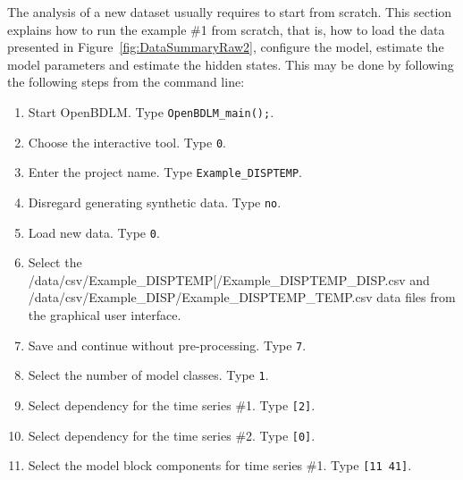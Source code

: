 The analysis of a new dataset usually requires to start from scratch.
This section explains how to run the example \#1 from scratch, that is, how to load the data presented in Figure~\ref{fig:DataSummaryRaw2}, configure the model, estimate the model parameters and estimate the hidden states.
This may be done by following the following steps from the \MATLAB{} command line:
\begin{enumerate}
\item Start OpenBDLM. Type \colorbox{light-gray}{\lstinline[basicstyle = \mlttfamily \small, backgroundcolor = \color{light-gray}]!OpenBDLM_main();!}.
\item Choose the interactive tool. Type \colorbox{light-gray}{\lstinline[basicstyle = \mlttfamily \small, backgroundcolor = \color{light-gray}]!0!}.
\item Enter the project name. Type \colorbox{light-gray}{\lstinline[basicstyle = \mlttfamily \small, backgroundcolor = \color{light-gray}]!Example_DISPTEMP!}. 
\item Disregard generating synthetic data. Type \colorbox{light-gray}{\lstinline[basicstyle = \mlttfamily \small, backgroundcolor = \color{light-gray}]!no!}. 
\item Load new data. Type \colorbox{light-gray}{\lstinline[basicstyle = \mlttfamily \small, backgroundcolor = \color{light-gray}]!0!}.
\item Select the /data/csv/Example\_DISPTEMP[/Example\_DISPTEMP\_DISP.csv and /data/csv/Example\_DISP/Example\_DISPTEMP\_TEMP.csv data files from the graphical user interface. 
\item Save and continue without pre-processing. Type \colorbox{light-gray}{\lstinline[basicstyle = \mlttfamily \small, backgroundcolor = \color{light-gray}]!7!}. 
\item Select the number of model classes. Type \colorbox{light-gray}{\lstinline[basicstyle = \mlttfamily \small, backgroundcolor = \color{light-gray}]!1!}. 
\item Select dependency for the time series \#1. Type \colorbox{light-gray}{\lstinline[basicstyle = \mlttfamily \small, backgroundcolor = \color{light-gray}]![2]!}.
\item Select dependency for the time series \#2. Type \colorbox{light-gray}{\lstinline[basicstyle = \mlttfamily \small, backgroundcolor = \color{light-gray}]![0]!}.
\item Select the model block components for time series \#1. Type \colorbox{light-gray}{\lstinline[basicstyle = \mlttfamily \small, backgroundcolor = \color{light-gray}]![11 41]!}.

\end{enumerate}

